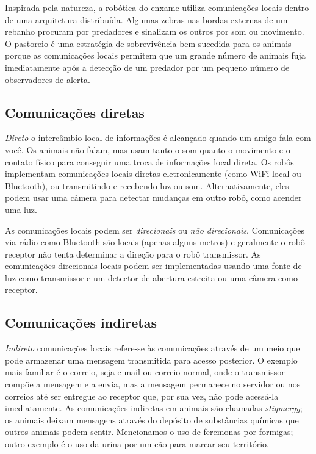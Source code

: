 Inspirada pela natureza, a robótica do enxame utiliza comunicações locais dentro de uma arquitetura distribuída. Algumas zebras nas bordas externas de um rebanho procuram por predadores e sinalizam os outros por som ou movimento. O pastoreio é uma estratégia de sobrevivência bem sucedida para os animais porque as comunicações locais permitem que um grande número de animais fuja imediatamente após a detecção de um predador por um pequeno número de observadores de alerta.

\subsection{Comunicações diretas}

\emph{Direto} o intercâmbio local de informações é alcançado quando um amigo fala com você. Os animais não falam, mas usam tanto o som quanto o movimento e o contato físico para conseguir uma troca de informações local direta. Os robôs implementam comunicações locais diretas eletronicamente (como WiFi local ou Bluetooth), ou transmitindo e recebendo luz ou som. Alternativamente, eles podem usar uma câmera para detectar mudanças em outro robô, como acender uma luz. 

As comunicações locais podem ser \emph{direcionais} ou \emph{não direcionais}. Comunicações via rádio como Bluetooth são locais (apenas alguns metros) e geralmente o robô receptor não tenta determinar a direção para o robô transmissor. As comunicações direcionais locais podem ser implementadas usando uma fonte de luz como transmissor e um detector de abertura estreita ou uma câmera como receptor.

\subsection{Comunicações indiretas}

\emph{Indireto} comunicações locais refere-se às comunicações através de um meio que pode armazenar uma mensagem transmitida para acesso posterior. O exemplo mais familiar é o correio, seja e-mail ou correio normal, onde o transmissor compõe a mensagem e a envia, mas a mensagem permanece no servidor ou nos correios até ser entregue ao receptor que, por sua vez, não pode acessá-la imediatamente. As comunicações indiretas em animais são chamadas \emph{stigmergy}; os animais deixam mensagens através do depósito de substâncias químicas que outros animais podem sentir. Mencionamos o uso de feremonas por formigas; outro exemplo é o uso da urina por um cão para marcar seu território.


